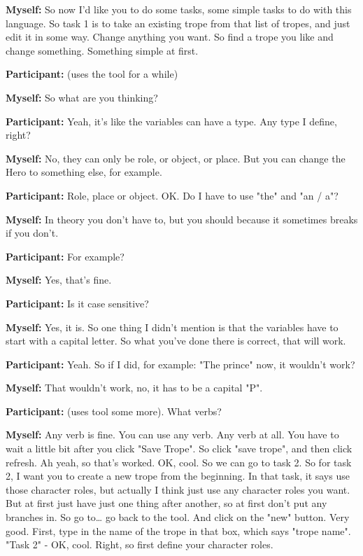 \documentclass[11pt]{report}
\begin{document}
\begin{linenumbers}
\textbf{Myself:} So now I'd like you to do some tasks, some simple tasks to do with this language. So task 1 is to take an existing trope from that list of tropes, and just edit it in some way. Change anything you want. So find a trope you like and change something. Something simple at first.

\textbf{Participant:} (uses the tool for a while)

\textbf{Myself:} So what are you thinking?

\textbf{Participant:} Yeah, it's like the variables can have a type. Any type I
define, right?

\textbf{Myself:} No, they can only be role, or object, or place. But you can change the Hero to something else, for example.

\textbf{Participant:} Role, place or object. OK. Do I have to use "the" and "an
/ a"?

\textbf{Myself:} In theory you don't have to, but you should because it sometimes breaks if you don't.

\textbf{Participant:} For example?

\textbf{Myself:} Yes, that's fine.

\textbf{Participant:} Is it case sensitive?

\textbf{Myself:} Yes, it is. So one thing I didn't mention is that the variables have to start with a capital letter. So what you've done there is correct, that will work.

\textbf{Participant:} Yeah. So if I did, for example: "The prince" now, it wouldn't work?

\textbf{Myself:} That wouldn't work, no, it has to be a capital "P".

\textbf{Participant:} (uses tool some more). What verbs?

\textbf{Myself:} Any verb is fine. You can use any verb. Any verb at all. You
have to wait a little bit after you click "Save Trope". So click "save trope",
and then click refresh. Ah yeah, so that's worked. OK, cool. So we can go to
task 2. So for task 2, I want you to create a new trope from the beginning. In
that task, it says use those character roles, but actually I think just use any
character roles you want. But at first just have just one thing after another,
so at first don't put any branches in. So go to\ldots{} go back to the tool. And
click on the "new" button. Very good. First, type in the name of the trope in
that box, which says "trope name". "Task 2" - OK, cool. Right, so first define
your character roles.


\end{linenumbers}
\end{document}
